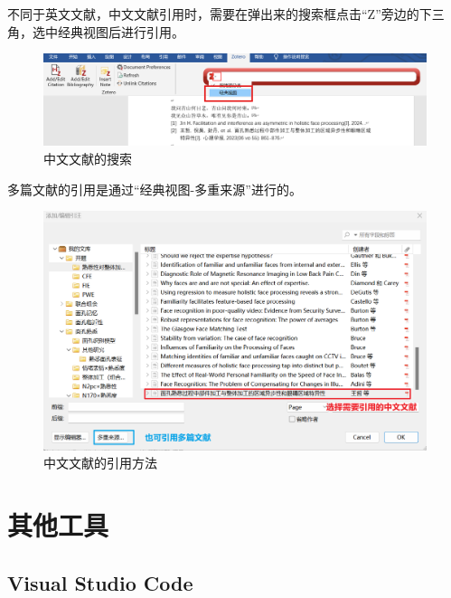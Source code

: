 \documentclass[]{ctexbook}
\theoremstyle{definition}
\theoremstyle{definition}
\theoremstyle{definition}
\theoremstyle{definition}
\theoremstyle{remark}
\begin{document}
不同于英文文献，中文文献引用时，需要在弹出来的搜索框点击``Z''旁边的下三角，选中经典视图后进行引用。

\begin{figure}

{\centering \includegraphics[width=1\linewidth]{img/zotero-cite-cn/ciation3} 

}

\caption{中文文献的搜索}\label{fig:Chinese-ciation}
\end{figure}

多篇文献的引用是通过``经典视图-多重来源''进行的。

\begin{figure}

{\centering \includegraphics[width=1\linewidth]{img/zotero-cite-cn/ciation4} 

}

\caption{中文文献的引用方法}\label{fig:Chinese-mutiple-ciation}
\end{figure}

\part{其他工具}\label{part-ux5176ux4ed6ux5de5ux5177}

\chapter{Visual Studio Code}\label{vscode}
\end{document}
